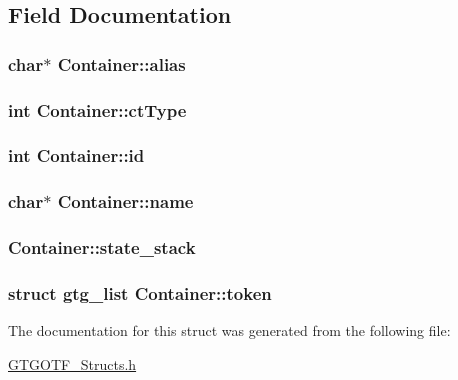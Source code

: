 \subsection{Field Documentation}
\hypertarget{structContainer_a92f0174d6eca6c4a0ef3e2ffef8be3e8}{
\subsubsection[{alias}]{\setlength{\rightskip}{0pt plus 5cm}char$\ast$ Container\-::alias}}\label{structContainer_a92f0174d6eca6c4a0ef3e2ffef8be3e8}
\hypertarget{structContainer_a4adf9cd564185bb1cee25d45a82c4f99}{
\subsubsection[{ct\-Type}]{\setlength{\rightskip}{0pt plus 5cm}int Container\-::ct\-Type}}\label{structContainer_a4adf9cd564185bb1cee25d45a82c4f99}
\hypertarget{structContainer_a055522338ea708fbdfbd6ddb4854b313}{
\subsubsection[{id}]{\setlength{\rightskip}{0pt plus 5cm}int Container\-::id}}\label{structContainer_a055522338ea708fbdfbd6ddb4854b313}
\hypertarget{structContainer_a67ce2f5aefbdfebfdf389731573933e1}{
\subsubsection[{name}]{\setlength{\rightskip}{0pt plus 5cm}char$\ast$ Container\-::name}}\label{structContainer_a67ce2f5aefbdfebfdf389731573933e1}
\hypertarget{structContainer_ae9e5eda153387bcd46a4a4495b7e044e}{
\subsubsection[{state\-\_\-stack}]{ Container\-::state\-\_\-stack}}\label{structContainer_ae9e5eda153387bcd46a4a4495b7e044e}
\hypertarget{structContainer_aacb0d89296e0646bc3b7c14b2e4636f4}{
\subsubsection[{token}]{\setlength{\rightskip}{0pt plus 5cm}struct {\bf gtg\-\_\-list} Container\-::token}}\label{structContainer_aacb0d89296e0646bc3b7c14b2e4636f4}


The documentation for this struct was generated from the following file\-:\begin{DoxyCompactItemize}
\item 
\hyperlink{GTGOTF__Structs_8h}{G\-T\-G\-O\-T\-F\-\_\-\-Structs.\-h}\end{DoxyCompactItemize}
